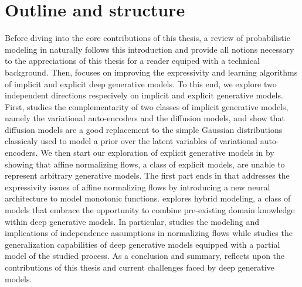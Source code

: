 \section{Outline and structure}


Before diving into the core contributions of this thesis, a review of probabilistic modeling in  naturally follows this introduction and provide all notions necessary to the appreciations of this thesis for a reader equiped with a technical background. Then,  focuses on improving the expressivity and learning algorithms of implicit and explicit deep generative models. To this end, we explore two independent directions respecively on implicit and explicit generative models. First,  studies the complementarity of two classes of implicit generative models, namely the variational auto-encoders and the diffusion models, and show that diffusion models are a good replacement to the simple Gaussian distributions classicaly used to model a prior over the latent variables of variational auto-encoders. We then start our exploration of explicit generative models in  by showing that affine normalizing flows, a class of explicit models, are unable to represent arbitrary generative models. The first part ends in  that addresses the expressivity issues of affine normalizing flows by introducing a new neural architecture to model monotonic functions.  explores hybrid modeling, a class of models that embrace the opportunity to combine pre-existing domain knowledge within deep generative models. In particular,  studies the modeling and implications of independence assumptions in normalizing flows while  studies the generalization capabilities of deep generative models equipped with a partial model of the studied process. As a conclusion and summary,  reflects upon the contributions of this thesis and current challenges faced by deep generative models.







